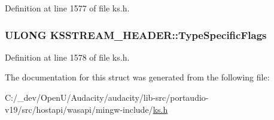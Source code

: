 Definition at line 1577 of file ks.\+h.

\subsubsection[{\texorpdfstring{Type\+Specific\+Flags}{TypeSpecificFlags}}]{\setlength{\rightskip}{0pt plus 5cm}U\+L\+O\+NG K\+S\+S\+T\+R\+E\+A\+M\+\_\+\+H\+E\+A\+D\+E\+R\+::\+Type\+Specific\+Flags}\hypertarget{struct_k_s_s_t_r_e_a_m___h_e_a_d_e_r_aeca53d4cbd064803b36196b9f8f632da}{}\label{struct_k_s_s_t_r_e_a_m___h_e_a_d_e_r_aeca53d4cbd064803b36196b9f8f632da}


Definition at line 1578 of file ks.\+h.



The documentation for this struct was generated from the following file\+:\begin{DoxyCompactItemize}
\item 
C\+:/\+\_\+dev/\+Open\+U/\+Audacity/audacity/lib-\/src/portaudio-\/v19/src/hostapi/wasapi/mingw-\/include/\hyperlink{ks_8h}{ks.\+h}\end{DoxyCompactItemize}
